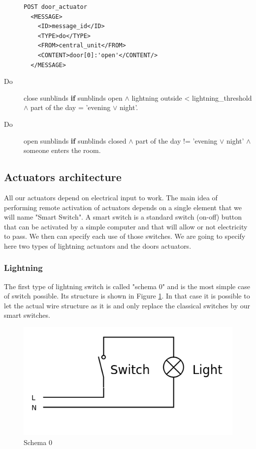\documentclass{acm_proc_article-sp}
\begin{document}
\begin{description}
 \begin{minipage}{\linewidth}
\begin{lstlisting}
POST door_actuator
  <MESSAGE>
    <ID>message_id</ID>
    <TYPE>do</TYPE>
    <FROM>central_unit</FROM>
    <CONTENT>door[0]:'open'</CONTENT/>
  </MESSAGE> 
\end{lstlisting}
\end{minipage}

 \item[Do] close sunblinds \textbf{if} sunblinds open $\land$ lightning outside < lightning\_threshold $\land$ part of the day = ’evening $\lor$ night’.
 \item[Do] open sunblinds \textbf{if} sunblinds closed $\land$ part of the day != ’evening $\lor$ night’ $\land$ someone enters the room.
\end{description}
\subsection{Actuators architecture}
All our actuators depend on electrical input to work. The main idea of performing remote activation of actuators depends on a single element that we will name "Smart Switch".
A smart switch is a standard switch (on-off) button that can be activated by a simple computer and that will allow or not electricity to pass.
We then can specify each use of those switches.
We are going to specify here two types of lightning actuators and the doors actuators.
\subsubsection{Lightning}
The first type of lightning switch is called "schema 0" and is the most simple case of switch possible.
Its structure is shown in Figure \ref{schema0}.
In that case it is possible to let the actual wire structure as it is and only replace the classical switches by our smart switches.

				\begin{figure}[htb]
  				\begin{center}
    				\includegraphics[width=\linewidth]{schema0}
    				\caption{Schema 0 \label{schema0}}
  				\end{center}
				\end{figure}
\end{document}
